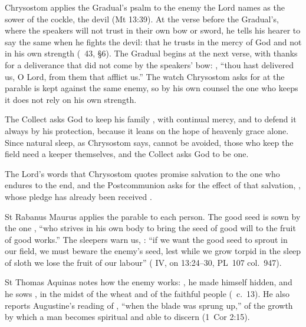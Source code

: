 Chrysostom applies the Gradual's psalm to the enemy the Lord names as the
sower of the cockle, the devil (Mt 13:39). At the verse before the Gradual's,
where the speakers will not trust in their own bow or sword, he tells his
hearer to say the same when he fights the devil: that he trusts in the mercy
of God and not in his own strength (\ 43, §6). The
Gradual begins at the next verse, with thanks for a deliverance that did not
come by the speakers' bow: , ``thou hast delivered us, O Lord, from them that afflict us.'' The watch
Chrysostom asks for at the parable is kept against the same enemy, so by his
own counsel the one who keeps it does not rely on his own strength.

The Collect asks God to keep his family , with
continual mercy, and to defend it always by his protection, because it leans
on the hope of heavenly grace alone. Since natural sleep, as Chrysostom says,
cannot be avoided, those who keep the field need a keeper themselves, and the
Collect asks God to be one.

The Lord's words that Chrysostom quotes promise salvation to the one who
endures to the end, and the Postcommunion asks for the effect of that
salvation, , whose pledge has already
been received .

St Rabanus Maurus applies the parable to each person. The good seed is sown
by the one , ``who strives in his own body to bring the
seed of good will to the fruit of good works.'' The sleepers warn us,
:
``if we want the good seed to sprout in our field, we must beware the enemy's
seed, lest while we grow torpid in the sleep of sloth we lose the fruit of
our labour'' ( IV, on 13:24--30, PL~107 col.~947).

St Thomas Aquinas notes how the enemy works: , he
made himself hidden, and he sows ,
in the midst of the wheat and of the faithful people (\
c.~13). He also reports Augustine's reading of ,
``when the blade was sprung up,'' of the growth by which a man becomes
spiritual and able to discern (1~Cor 2:15).

